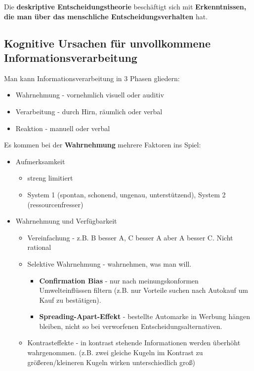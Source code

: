 Die \textbf{deskriptive Entscheidungstheorie} beschäftigt sich mit
\textbf{Erkenntnissen, die man über das menschliche Entscheidungsverhalten} hat.

\subsection{Kognitive Ursachen für unvollkommene Informationsverarbeitung}
Man kann Informationsverarbeitung in 3 Phasen gliedern:
\begin{itemize}
    \item Wahrnehmung - vornehmlich visuell oder auditiv

    \item Verarbeitung - durch Hirn, räumlich oder verbal
    \item Reaktion - manuell oder verbal
\end{itemize}
Es kommen bei der \textbf{Wahrnehmung} mehrere Faktoren ins Spiel:
\begin{itemize}
    \item Aufmerksamkeit
    \begin{itemize}
        \item streng limitiert
        \item System 1 (spontan, schonend, ungenau, unterstützend),
            System 2 (ressourcenfresser)

    \end{itemize}
    \item Wahrnehmung und Verfügbarkeit
    \begin{itemize}
        \item Vereinfachung - z.B. B besser A, C besser A aber A besser C.
            Nicht rational
        \item Selektive Wahrnehmung - wahrnehmen, was man will.
        \begin{itemize}
            \item \textbf{Confirmation Bias} - nur nach meinungskonformen
            Umwelteinflüssen filtern (z.B. nur Vorteile suchen nach Autokauf
            um Kauf zu bestätigen).
            \item \textbf{Spreading-Apart-Effekt} - bestellte Automarke
            in Werbung hängen bleiben, nicht so bei verworfenen
            Entscheidungsalternativen.
        \end{itemize}
        \item Kontrasteffekte - in kontrast stehende Informationen werden
            überhöht wahrgenommen. (z.B. zwei gleiche Kugeln im Kontrast
            zu größeren/kleineren Kugeln wirken unterschiedlich groß)
    \end{itemize}
\end{itemize}

